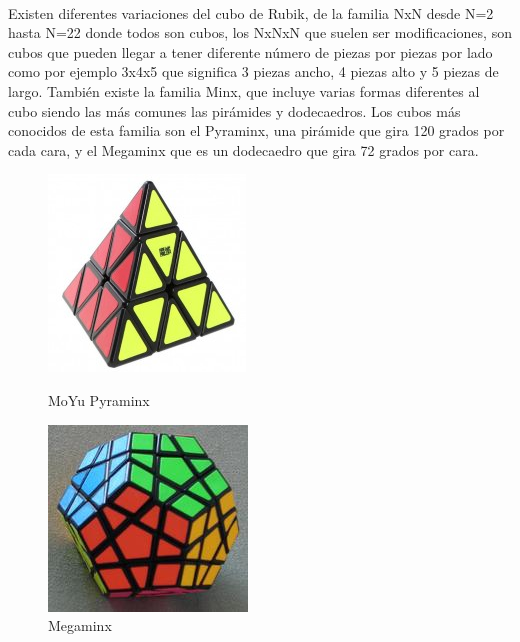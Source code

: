\documentclass[12pt, letterpaper]{article}
\begin{document}
\paragraph{}
Existen diferentes variaciones del cubo de Rubik, de la familia NxN desde N=2 hasta N=22 donde todos son cubos, los NxNxN que suelen ser modificaciones, son cubos que pueden llegar a tener diferente número de piezas por piezas por lado como por ejemplo 3x4x5 que significa 3 piezas ancho, 4 piezas alto y 5 piezas de largo. También existe la familia Minx, que incluye varias formas diferentes al cubo siendo las más comunes las pirámides y dodecaedros. Los cubos más conocidos de esta familia son el Pyraminx, una pirámide que gira 120 grados por cada cara, y el Megaminx que es un dodecaedro que gira 72 grados por cara.
\begin{figure}[ht]
   \begin{minipage}{0.48\textwidth}
     \centering
     \includegraphics[width=.7\linewidth]{images/pyraminx.jpg}
     \caption{MoYu Pyraminx}\label{Fig:pyraminx}
   \end{minipage}\hfill
   \begin {minipage}{0.48\textwidth}
     \centering
     \includegraphics[width=.7\linewidth]{images/megaminx.jpg}
     \caption{Megaminx}\label{Fig:megaminx}
   \end{minipage}		
\end{figure}
\end{document}
